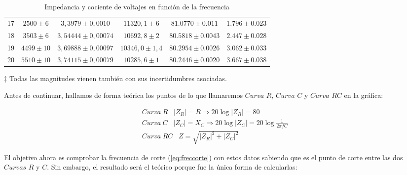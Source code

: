 \documentclass[11pt]{report}
\begin{document}
\begin{refsection}
\begin{table}[H]
\begin{threeparttable}
\begin{tabular}{|c|c|c|c|c|c|}
17 & $2500 \pm 6$ & $3,3979 \pm 0,0010$ & $11320,1\pm 6$&$81.0770\pm0.011$&$1.796\pm0.023$\\
18 & $3503 \pm 6$ & $3,54444 \pm 0,00074$ & $10692,8\pm 2$&$80.5818\pm0.0043$&$2.447\pm0.028$\\
19 & $4499 \pm 10$ & $3,69888 \pm 0,00097$ & $10346,0\pm 1,4$&$80.2954\pm0.0026$&$3.062\pm0.033$\\
20 & $5510 \pm 10$ & $3,74115 \pm 0,00079$ & $10285,6\pm 1$&$80.2446\pm0.0020$&$3.667\pm0.038$\\
\hline
\end{tabular}
\begin{tablenotes}
\item[$\ddagger$] Todas las magnitudes vienen también con sus incertidumbres asociadas.
\end{tablenotes}
\end{threeparttable}
\caption{Impedancia y cociente de voltajes en función de la frecuencia}
\label{tab:impedancia vs. frecuencia}
\end{table}
\bigskip

Antes de continuar, hallamos de forma teórica los puntos de lo que llamaremos $Curva \hspace{4pt}R$, $Curva \hspace{4pt}C$
 y $Curva\hspace{4pt} RC$ en la gráfica:

\begin{center}
\begin{equation}
\begin{split}
    Curva \hspace{3pt}R \hspace{10pt} |Z_R|=R \Rightarrow 20\log |Z_R| = 80 \hspace{4pt} \\
    Curva \hspace{3pt}C \hspace{10pt} |Z_C|=X_C \Rightarrow 20\log|Z_C| =20\log \frac{1}{2\pi f C}\hspace{4pt} \\
    Curva \hspace{3pt}RC \hspace{10pt} Z=\sqrt{|Z_R|^2+|Z_C|^2}\hspace{4pt}
\end{split}
\end{equation}
\end{center}

El objetivo ahora es comprobar la frecuencia de corte (\ref{eq:freccorte}) con estos datos sabiendo que es el punto de corte entre
las dos $Curvas\hspace{4pt} R$ y $C$. Sin embargo, el resultado será el teórico porque fue la única forma de calcularlas:


\end{refsection}
\end{document}
